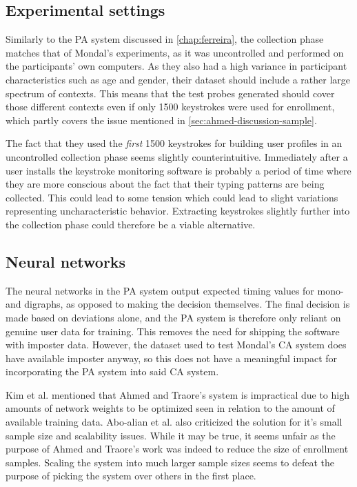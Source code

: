 \documentclass[informationsecurity]{gucmasterproject}
\begin{document}
\subsection{Experimental settings}
Similarly to the PA system discussed in \cref{chap:ferreira}, the collection phase matches that of Mondal's \cite{mondal} experiments, as it was uncontrolled and performed on the participants' own computers.
As they also had a high variance in participant characteristics such as age and gender, their dataset should include a rather large spectrum of contexts.
This means that the test probes generated should cover those different contexts even if only 1500 keystrokes were used for enrollment, which partly covers the issue mentioned in \cref{sec:ahmed-discussion-sample}.

The fact that they used the \textit{first} 1500 keystrokes for building user profiles in an uncontrolled collection phase seems slightly counterintuitive.
Immediately after a user installs the keystroke monitoring software is probably a period of time where they are more conscious about the fact that their typing patterns are being collected. 
This could lead to some tension which could lead to slight variations representing uncharacteristic behavior.
Extracting keystrokes slightly further into the collection phase could therefore be a viable alternative.


\subsection{Neural networks}
The neural networks in the PA system output expected timing values for mono- and digraphs, as opposed to making the decision themselves.
The final decision is made based on deviations alone, and the PA system is therefore only reliant on genuine user data for training.
This removes the need for shipping the software with imposter data.
However, the dataset used to test Mondal's \cite{mondal} CA system does have available imposter anyway, so this does not have a meaningful impact for incorporating the PA system into said CA system.

Kim et al. \cite{KIM2017} mentioned that Ahmed and Traore's system is impractical due to high amounts of network weights to be optimized seen in relation to the amount of available training data.
Abo-alian et al. \cite{CPE3718} also criticized the solution for it's small sample size and scalability issues.
While it may be true, it seems unfair as the purpose of Ahmed and Traore's work was indeed to reduce the size of enrollment samples.
Scaling the system into much larger sample sizes seems to defeat the purpose of picking the system over others in the first place.
\end{document}
